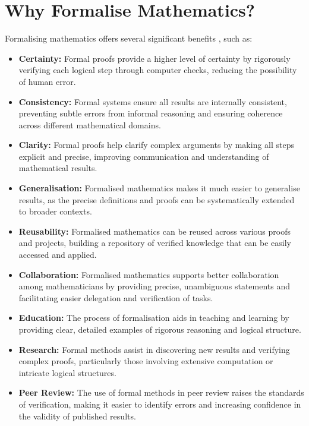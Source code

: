 \section{Why Formalise Mathematics?}

Formalising mathematics offers several significant benefits \cite{Massot2021}, such as:

\begin{itemize}
    \item \textbf{Certainty:} Formal proofs provide a higher level of certainty by rigorously verifying each logical step through computer checks, reducing the possibility of human error.
    \item \textbf{Consistency:} Formal systems ensure all results are internally consistent, preventing subtle errors from informal reasoning and ensuring coherence across different mathematical domains.
    \item \textbf{Clarity:} Formal proofs help clarify complex arguments by making all steps explicit and precise, improving communication and understanding of mathematical results.
    \item \textbf{Generalisation:} Formalised mathematics makes it much easier to generalise results, as the precise definitions and proofs can be systematically extended to broader contexts.
    \item \textbf{Reusability:} Formalised mathematics can be reused across various proofs and projects, building a repository of verified knowledge that can be easily accessed and applied.
    \item \textbf{Collaboration:} Formalised mathematics supports better collaboration among mathematicians by providing precise, unambiguous statements and facilitating easier delegation and verification of tasks.
    \item \textbf{Education:} The process of formalisation aids in teaching and learning by providing clear, detailed examples of rigorous reasoning and logical structure.
    \item \textbf{Research:} Formal methods assist in discovering new results and verifying complex proofs, particularly those involving extensive computation or intricate logical structures.
    \item \textbf{Peer Review:} The use of formal methods in peer review raises the standards of verification, making it easier to identify errors and increasing confidence in the validity of published results.
\end{itemize}

